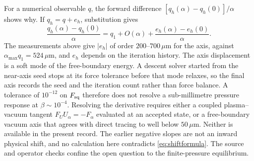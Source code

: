 For a numerical observable $q$, the forward difference $[q_h(\alpha)-q_h(0)]/\alpha$ shows why. If $q_h=q+e_h$, substitution gives
\begin{equation}
 \frac{q_h(\alpha)-q_h(0)}{\alpha}
 =q_1+O(\alpha)+\frac{e_h(\alpha)-e_h(0)}{\alpha}.
 \label{eq:derivativeerror}
\end{equation}
The measurements above give $|e_h|$ of order $200$--$700\,\mu\mathrm m$ for the axis, against $\alpha_{\max}q_1=524\,\mu\mathrm m$, and $e_h$ depends on the iteration history. The axis displacement is a soft mode of the free-boundary energy. A descent solver started from the near-axis seed stops at its force tolerance before that mode relaxes, so the final axis records the seed and the iteration count rather than force balance. A tolerance of $10^{-12}$ on $F_{\rm sq}$ therefore does not resolve a sub-millimetre pressure response at $\beta\sim10^{-4}$. Resolving the derivative requires either a coupled plasma--vacuum tangent $F_UU_\alpha=-F_\alpha$ evaluated at an accepted state, or a free-boundary vacuum axis that agrees with direct tracing to well below $50\,\mu\mathrm m$. Neither is available in the present record. The earlier negative slopes are not an inward physical shift, and no calculation here contradicts \eqref{eq:shiftformula}. The source and operator checks confine the open question to the finite-pressure equilibrium.

